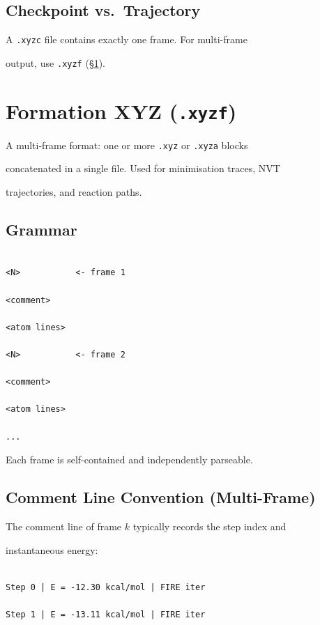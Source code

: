 \documentclass[12pt, a4paper, oneside]{article}
\begin{document}
\subsection{Checkpoint vs.\ Trajectory}


A \texttt{.xyzc} file contains exactly one frame.  For multi-frame

output, use \texttt{.xyzf} (\S\ref{sec:xyzf}).



\section{Formation XYZ (\texttt{.xyzf})}

\label{sec:xyzf}



A multi-frame format: one or more \texttt{.xyz} or \texttt{.xyza} blocks

concatenated in a single file.  Used for minimisation traces, NVT

trajectories, and reaction paths.


\subsection{Grammar}


\begin{lstlisting}[language={},frame=single]

<N>           <- frame 1

<comment>

<atom lines>

<N>           <- frame 2

<comment>

<atom lines>

...

\end{lstlisting}


Each frame is self-contained and independently parseable.


\subsection{Comment Line Convention (Multi-Frame)}


The comment line of frame $k$ typically records the step index and

instantaneous energy:


\begin{lstlisting}[language={},frame=single]

Step 0 | E = -12.30 kcal/mol | FIRE iter

Step 1 | E = -13.11 kcal/mol | FIRE iter

\end{lstlisting}
\end{document}
